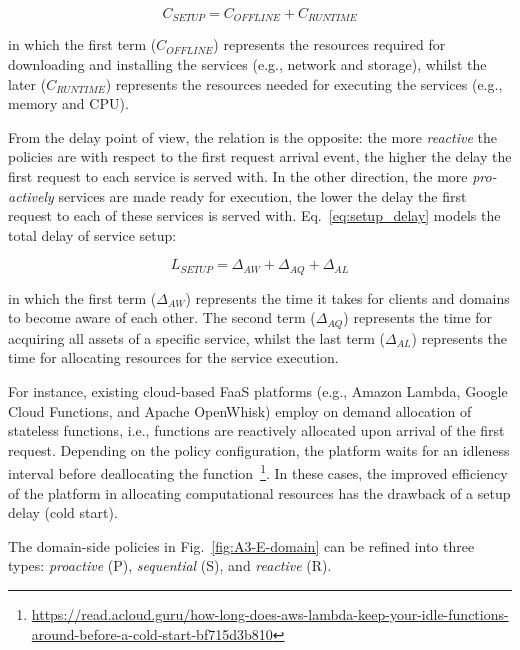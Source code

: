 \begin{equation}\label{eq:setup_cost}
C_{SETUP} = C_{OFFLINE} + C_{RUNTIME}
\end{equation}

\noindent
in which the first term ($C_{OFFLINE}$) represents the resources required for downloading and installing the services (e.g., network and storage), whilst the later ($C_{RUNTIME}$) represents the resources needed for executing the services (e.g., memory and CPU). 

From the delay point of view, the relation is the opposite: the more \textit{reactive} the policies are with respect to the first request arrival event, the higher the delay the first request to each service is served with. In the other direction, the more \textit{pro-actively} services are made ready for execution, the lower the delay the first request to each of these services is served with. Eq.~\ref{eq:setup_delay} models the total delay of service setup:

\begin{equation}\label{eq:setup_delay}
L_{SETUP} = \Delta_{AW} + \Delta_{AQ} + \Delta_{AL}
\end{equation}

\noindent
in which the first term ($\Delta_{AW}$) represents the time it takes for clients and domains to become aware of each other. The second term ($\Delta_{AQ}$) represents the time for acquiring all assets of a specific service, whilst the last term ($\Delta_{AL}$) represents the time for allocating resources for the service execution. 

For instance, existing cloud-based FaaS platforms (e.g., Amazon Lambda, Google Cloud Functions, and Apache OpenWhisk) employ on demand allocation of stateless functions, i.e., functions are reactively allocated upon arrival of the first request. Depending on the policy configuration, the platform waits for an idleness interval before deallocating the function~\footnote{\url{https://read.acloud.guru/how-long-does-aws-lambda-keep-your-idle-functions-around-before-a-cold-start-bf715d3b810}}. In these cases, the improved efficiency of the platform in allocating computational resources has the drawback of a setup delay (cold start). 

The domain-side policies in Fig.~\ref{fig:A3-E-domain} can be refined into three types: \textit{proactive} (P), \textit{sequential} (S), and \textit{reactive} (R). 

